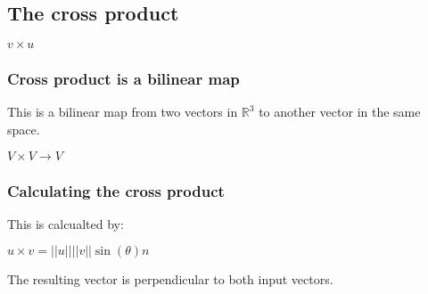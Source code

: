 
\subsection{The cross product}

\(v\times  u\)

\subsubsection{Cross product is a bilinear map}

This is a bilinear map from two vectors in \(\mathbb{R}^3\) to another vector in the same space.

\(V\times V \rightarrow V\)

\subsubsection{Calculating the cross product}

This is calcualted by:

\(u\times v=||u|| ||v|| \sin(\theta )n\)

The resulting vector is perpendicular to both input vectors.

